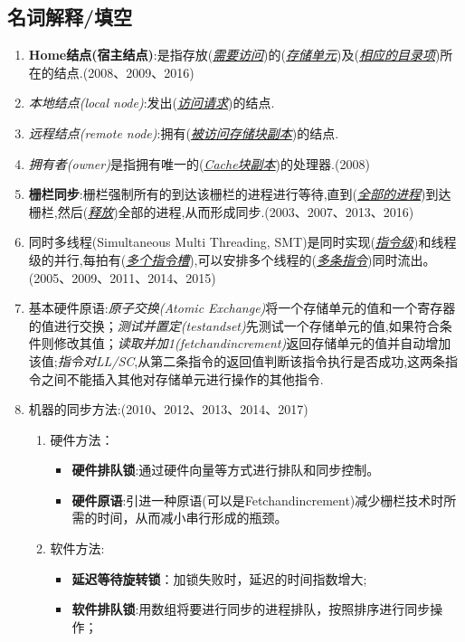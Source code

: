 \documentclass[a4paper]{ctexart}
\newcommand{\li}{\uline{\hspace{0.5em}}}
\newcommand{\blank}[1]{(\emph{\underline{#1}})}
\begin{document}
\subsection{名词解释/填空}
\begin{enumerate}
  \item \textbf{Home结点(宿主结点)}:是指存放\blank{需要访问}的\blank{存储单元}及\blank{相应的目录项}所在的结点.(2008、2009、2016)
  \item \emph{本地结点(local node)}:发出\blank{访问请求}的结点.
  \item \emph{远程结点(remote node)}:拥有\blank{被访问存储块副本}的结点.
  \item \emph{拥有者(owner)}是指拥有唯一的\blank{Cache块副本}的处理器.(2008)
  \item \textbf{栅栏同步}:栅栏强制所有的到达该栅栏的进程进行等待,直到(\emph{\underline{全部的进程}})到达栅栏,然后(\emph{\underline{释放}})全部的进程,从而形成同步.(2003、2007、2013、2016)
  \item 同时多线程(Simultaneous Multi Threading, SMT)是同时实现(\emph{\underline{指令级}})和线程级的并行,每拍有(\emph{\underline{多个指令槽}}),可以安排多个线程的(\emph{\underline{多条指令}})同时流出。(2005、2009、2011、2014、2015)
  \item 基本硬件原语:\emph{原子交换(Atomic Exchange)}将一个存储单元的值和一个寄存器的值进行交换；\emph{测试并置定(test\li and\li set)}先测试一个存储单元的值,如果符合条件则修改其值；\emph{读取并加1(fetch\li and\li increment)}返回存储单元的值并自动增加该值;\emph{指令对LL/SC},从第二条指令的返回值判断该指令执行是否成功,这两条指令之间不能插入其他对存储单元进行操作的其他指令.
  \item 机器的同步方法:(2010、2012、2013、2014、2017)
  \begin{enumerate}
    \item 硬件方法：
    \begin{itemize}
      \item \textbf{硬件排队锁}:通过硬件向量等方式进行排队和同步控制。
      \item \textbf{硬件原语}:引进一种原语(可以是Fetch\li and\li increment)减少栅栏技术时所需的时间，从而减小串行形成的瓶颈。
    \end{itemize}
    \item 软件方法:
    \begin{itemize}
      \item \textbf{延迟等待旋转锁}：加锁失败时，延迟的时间指数增大;
      \item \textbf{软件排队锁}:用数组将要进行同步的进程排队，按照排序进行同步操作；

\end{itemize}
\end{enumerate}
\end{enumerate}
\end{document}
